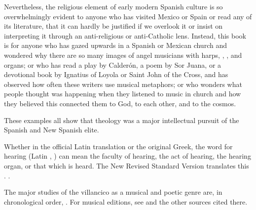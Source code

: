 Nevertheless, the religious element of early modern Spanish culture is so
overwhelmingly evident to anyone who has visited Mexico or Spain or read any of
its literature, that it can hardly be justified if we overlook it or insist on
interpreting it through an anti-religious or anti-Catholic lens.
Instead, this book is for anyone who has gazed upwards in a Spanish or Mexican
church and wondered why there are so many images of angel musicians with harps,
, , and organs; or who has read a play by
Calderón, a poem by Sor Juana, or a devotional book by Ignatius of Loyola or
Saint John of the Cross, and has observed how often these writers use musical
metaphors; or who wonders what people thought was happening when they listened
to music in church and how they believed this connected them to God, to each
other, and to the cosmos.

These examples all show that theology was a major intellectual pursuit of the
Spanish and New Spanish elite.

\begin{Footnote}
    Whether in the official Latin translation or the original Greek, the word for
    hearing (Latin , \Greek {}) can mean the faculty of
    hearing, the act of hearing, the hearing organ, or that which is heard.
    The New Revised Standard Version translates this .
    \Autocites{Weber:Vulgate}{Aland:GNT4}[]{BDAG}.
\end{Footnote}



\begin{Footnote}
    The major studies of the villancico as a musical and poetic genre are, in
    chronological order,
    \autocites{Rubio:Forma}{Laird:VC}{Torrente:PhD}{Tenorio:SorJuana}
    {CaberoPueyo:PhD}{Illari:Polychoral}{Knighton-Torrente:VCs}
    {Davies:Guadalupe}
    {Cashner:Cards}{Cashner:PhD}
    {LopezLorenzo:VC-Sevillano}{Swadley:VillancicoPhD}{Torrente:Historia17C}
    {ChavezBarcenas:PhD}.
    For musical editions, see \autocite{Cashner:WLSCM32} and the other sources
    cited there.
\end{Footnote}



